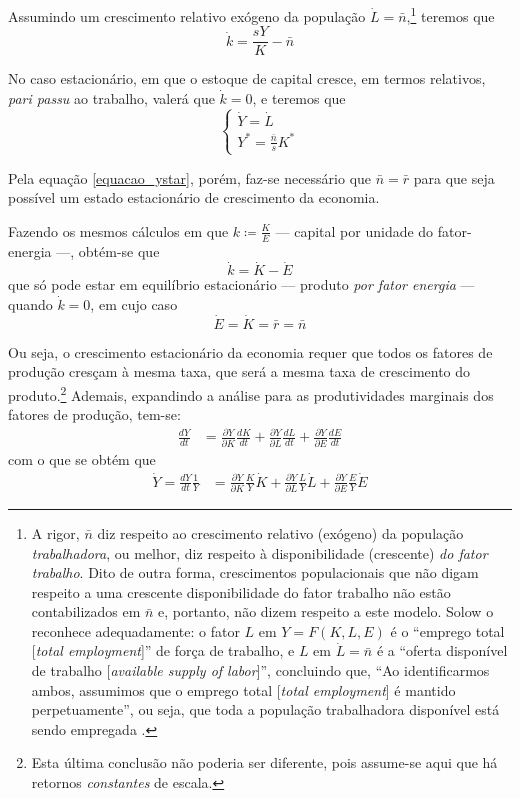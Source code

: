 Assumindo um crescimento relativo exógeno da população $\dot{L} = \bar{n}$,\footnote{A rigor, $\bar{n}$ diz respeito ao crescimento relativo (exógeno) da população \textit{trabalhadora}, ou melhor, diz respeito à disponibilidade (crescente) \textit{do fator trabalho}. Dito de outra forma, crescimentos populacionais que não digam respeito a uma crescente disponibilidade do fator trabalho não estão contabilizados em $\bar{n}$ e, portanto, não dizem respeito a este modelo. Solow o reconhece adequadamente: o fator $L$ em $Y=F(K,L,E)$ é o ``emprego total [\textit{total employment}]'' de força de trabalho, e $L$ em $\dot{L} = \bar{n}$ é a ``oferta disponível de trabalho [\textit{available supply of labor}]'', concluindo que, ``Ao identificarmos ambos, assumimos que o emprego total [\textit{total employment}] é mantido perpetuamente'', ou seja, que toda a população trabalhadora disponível está sendo empregada \parencite[p. 67]{Solow1956}.} teremos que
$$
\dot{k} = \frac{sY}{K} - \bar{n}
$$

No caso estacionário, em que o estoque de capital cresce, em termos relativos, \textit{pari passu} ao trabalho, valerá que $\dot{k}=0$, e teremos que
$$
\begin{cases}
\dot{Y}=\dot{L}  \\
Y^{*} = \frac{\bar{n}}{s} K^{*}
\end{cases}
$$

Pela equação \ref{equacao_ystar}, porém, faz-se necessário que $\bar{n}=\bar{r}$ para que seja possível um estado estacionário de crescimento da economia.

Fazendo os mesmos cálculos em que $k\coloneqq \frac{K}{E}$ --- capital por unidade do fator-energia ---, obtém-se que
$$
\dot{k} = \dot{K}-\dot{E}
$$
que só pode estar em equilíbrio estacionário — produto \textit{por fator energia} — quando $\dot{k}=0$, em cujo caso
$$
\dot{E} = \dot{K}=\bar{r}=\bar{n}
$$

Ou seja, o crescimento estacionário da economia requer que todos os fatores de produção cresçam à mesma taxa, que será a mesma taxa de crescimento do produto.\footnote{Esta última conclusão não poderia ser diferente, pois assume-se aqui que há retornos \textit{constantes} de escala.} Ademais, expandindo a análise para as produtividades marginais dos fatores de produção, tem-se:
\begin{align*}
\frac{dY}{dt} &= \frac{ \partial Y }{ \partial K } \frac{dK}{dt} + \frac{ \partial Y }{ \partial L }  \frac{dL}{dt} + \frac{ \partial Y }{ \partial E } \frac{dE}{dt}
\end{align*}
com o que se obtém que
\begin{align*}
\dot{Y} = \frac{dY}{dt} \frac{1}{Y} &= \frac{ \partial Y }{ \partial K } \frac{K}{Y} \dot{K} +  \frac{ \partial Y }{ \partial L } \frac{L}{Y} \dot{L} + \frac{ \partial Y }{ \partial E } \frac{E}{Y} \dot{E}
\end{align*}

